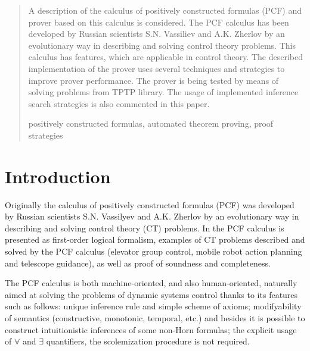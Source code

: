\documentclass[runningheads,a4paper]{llncs}
\newcommand{\keywords}[1]{\par\addvspace\baselineskip
\noindent\keywordname\enspace\ignorespaces#1}
\begin{document}
\begin{abstract}
A description of the calculus of positively constructed formulas (PCF) and prover based on this calculus is considered. The PCF calculus has been developed by Russian scientists S.N. Vassiliev and A.K. Zherlov by an evolutionary way in describing and solving control theory problems. This calculus has features, which are applicable in control theory. The described implementation of the prover uses several techniques and strategies to improve prover performance. The prover is being tested by means of solving problems from TPTP library. The usage of implemented inference search strategies is also commented in this paper.
\keywords{positively constructed formulas, automated theorem proving, proof strategies}
\end{abstract}



\section{Introduction}

Originally \cite{SNV1990,ICDS2000} the calculus of positively constructed formulas (PCF) was developed by Russian scientists S.N. Vassilyev and A.K. Zherlov by an evolutionary way in describing and solving control theory (CT) problems. In \cite{ICDS2000} the PCF calculus is presented as first-order logical formalism, examples of CT problems described and solved by the PCF calculus (elevator group control, mobile robot action planning and telescope guidance), as well as proof of soundness and completeness.

The PCF calculus is both machine-oriented, and also human-oriented, naturally aimed at solving the problems of dynamic systems control thanks to its features such as follows: unique inference rule and simple scheme of axioms; modifyability of semantics (constructive, monotonic, temporal, etc.) and besides it is possible to construct intuitionistic inferences of some non-Horn formulas; the explicit usage of $\forall$ and $\exists$ quantifiers, the scolemization procedure is not required.
\end{document}
